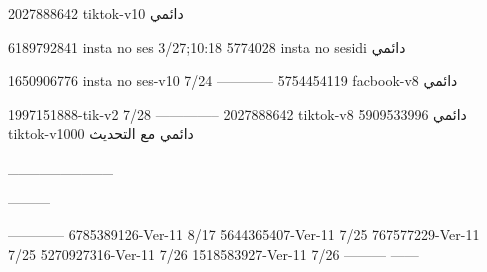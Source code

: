 2027888642 tiktok-v10
دائمي

6189792841 insta no ses
3/27;10:18
5774028 insta no sesidi
دائمي

1650906776 insta no ses-v10
7/24
------------
5754454119 facbook-v8
دائمي

1997151888-tik-v2
7/28
--------------
2027888642 tiktok-v8
دائمي
5909533996 tiktok-v1000
دائمي مع التحديث

__________

---------

------------
6785389126-Ver-11
8/17
5644365407-Ver-11
7/25
767577229-Ver-11
7/25
5270927316-Ver-11
7/26
1518583927-Ver-11
7/26
---------
------
